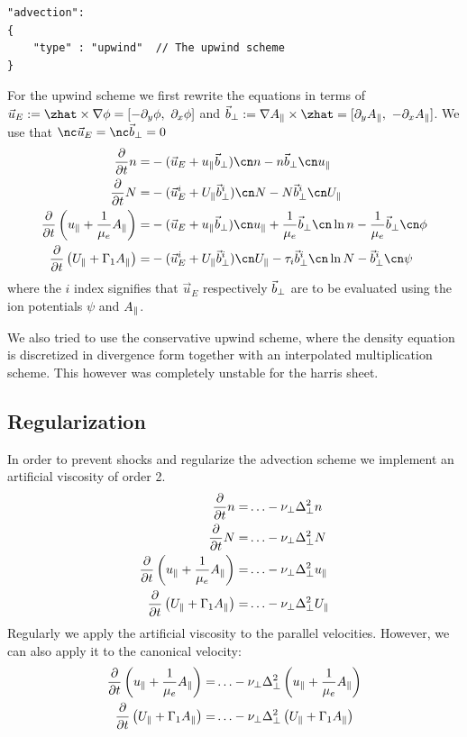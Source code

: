 \begin{verbatim}
"advection":
{
    "type" : "upwind"  // The upwind scheme
}
\end{verbatim}
For the upwind scheme we first rewrite the equations in terms of
$\vec u_E := \zhat \times \nabla\phi = [-\partial_y \phi,\ \partial_x \phi]$ and
$\bperp := \nabla \Apar \times \zhat = [\partial_y \Apar,\ -\partial_x \Apar]$. We use
that $\nc \vec u_E = \nc \bperp =0$
\begin{align}
\frac{\partial}{\partial t} \ne =&
- ( \vec u_E + \ue \bperp)\cn \ne - \ne \bperp \cn  \ue
\\
\frac{\partial}{\partial t} \Ni =&
- ( \vec u_E^i + \Ui \bperp^i)\cn \Ni - \Ni \bperp^i\cn  \Ui
 \\
\frac{\partial}{\partial t} \left( \ue+ \frac{1}{\mu_e} \Apar \right) =&
-  (\vec u_E + \ue \bperp ) \cn \ue
+ \frac{1}{\mu_e} \bperp \cn \ln \ne
- \frac{1}{\mu_e} \bperp \cn \phi
      \\
      \frac{\partial}{\partial t} \left( \Ui+ \Gamma_1 \Apar  \right) =&
    - (\vec u_E^i + \Ui \bperp^i ) \cn \Ui
    - \tau_i \bperp^i \cn \ln \Ni
    - \bperp^i \cn \psi
\end{align}
where the $i$ index signifies that $\vec u_E$ respectively $ \vec b_\perp$ are to
be evaluated using the ion potentials $\psi$ and $A_\parallel$.
\begin{tcolorbox}[title=Note]
    We also tried to use the conservative upwind scheme, where the density equation
    is discretized in divergence form together with an interpolated multiplication
    scheme. This however was completely unstable for the harris sheet.
\end{tcolorbox}
\subsection{Regularization} \label{sec:regularization}
In order to prevent shocks and regularize the advection scheme
we implement an artificial viscosity of order 2.
\begin{align}
    \frac{\partial}{\partial t} n  =& \ldots -\nu_\perp \Delta_\perp^2 n 
\\
\frac{\partial}{\partial t} N =& \ldots -\nu_\perp \Delta_\perp^2 N
 \\
\frac{\partial}{\partial t} \left( u_\parallel+ \frac{1}{\mu_e} A_\parallel \right) =&
\ldots -\nu_\perp \Delta_\perp^2 u_\parallel
      \\
      \frac{\partial}{\partial t} \left( U_\parallel+ \Gamma_1 A_\parallel  \right) =& \ldots -\nu_\perp \Delta_\perp^2 U_\parallel
\end{align}
Regularly we apply the artificial viscosity to the parallel velocities. However,
we can also apply it to the canonical velocity:
\begin{align}
\frac{\partial}{\partial t} \left( u_\parallel+ \frac{1}{\mu_e} A_\parallel \right) =&
\ldots -\nu_\perp \Delta_\perp^2 \left( u_\parallel+ \frac{1}{\mu_e} A_\parallel \right)
      \\
      \frac{\partial}{\partial t} \left( U_\parallel+ \Gamma_1 A_\parallel  \right) =& \ldots -\nu_\perp \Delta_\perp^2 \left( U_\parallel+ \Gamma_1 A_\parallel  \right)
\end{align}

